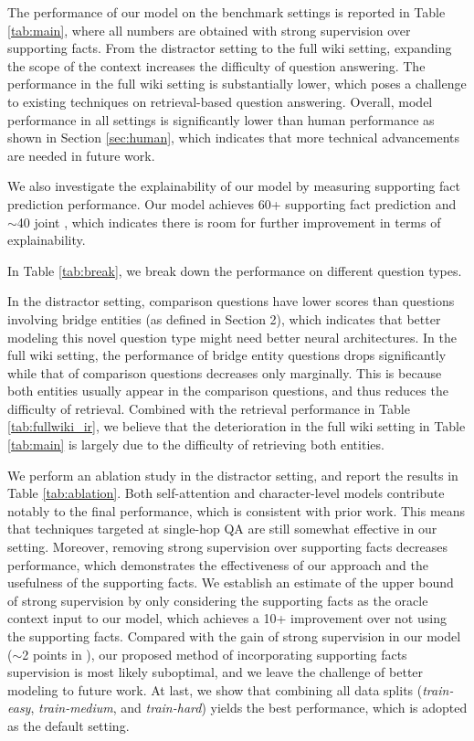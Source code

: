 The performance of our model on the benchmark settings is reported in Table \ref{tab:main}, where all numbers are obtained with strong supervision over supporting facts. From the distractor setting to the full wiki setting, expanding the scope of the context increases the difficulty of question answering. The performance in the full wiki setting is substantially lower, which poses a challenge to existing techniques on retrieval-based question answering. Overall, model performance in all settings is significantly lower than human performance as shown in Section \ref{sec:human}, which indicates that more technical advancements are needed in future work.

We also investigate the explainability of our model by measuring supporting fact prediction performance. Our model achieves 60+ supporting fact prediction \fone{} and $\sim$40 joint \fone{}, which indicates there is room for further improvement in terms of explainability.

In Table \ref{tab:break}, we break down the performance on different question types.

In the distractor setting, comparison questions have lower \fone{} scores than questions involving bridge entities (as defined in Section 2), which indicates that better modeling this novel question type might need better neural architectures. In the full wiki setting, the performance of bridge entity questions drops significantly while that of comparison questions decreases only marginally. This is because both entities usually appear in the comparison questions, and thus reduces the difficulty of retrieval. Combined with the retrieval performance in Table \ref{tab:fullwiki_ir}, we believe that the deterioration in the full wiki setting in Table \ref{tab:main} is largely due to the difficulty of retrieving both entities.

We perform an ablation study in the distractor setting, and report the results in Table \ref{tab:ablation}.
Both self-attention and character-level models contribute notably to the final performance, which is consistent with prior work. This means that techniques targeted at single-hop QA are still somewhat effective in our setting. Moreover, removing strong supervision over supporting facts decreases performance, which demonstrates the effectiveness of our approach and the usefulness of the supporting facts. We establish an estimate of the upper bound of strong supervision by only considering the supporting facts as the oracle context input to our model, which achieves a 10+ \fone{} improvement over not using the supporting facts. Compared with the gain of strong supervision in our model ($\sim$2 points in \fone{}), our proposed method of incorporating supporting facts supervision is most likely suboptimal, and we leave the challenge of better modeling to future work. At last, we show that combining all data splits (\textit{train-easy}, \textit{train-medium}, and \textit{train-hard}) yields the best performance, which is adopted as the default setting.

